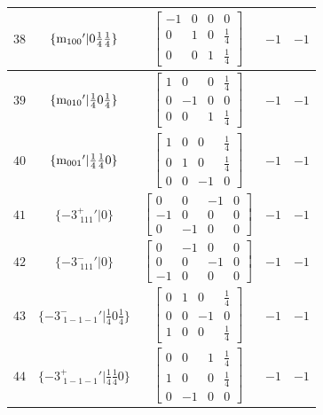 \documentclass[fleqn,8pt]{jsarticle}
\begin{document}
\begin{longtable}{ccccc}
$ 38 $ & $ \{{\rm m}_{100}{}'|0 \frac{1}{4} \frac{1}{4}\} $ & $ \begin{bmatrix} -1 & 0 & 0 & 0 \\ 0 & 1 & 0 & \frac{1}{4} \\ 0 & 0 & 1 & \frac{1}{4} \end{bmatrix} $ & $ -1 $ & $ -1 $ \\ \hline
$ 39 $ & $ \{{\rm m}_{010}{}'|\frac{1}{4} 0 \frac{1}{4}\} $ & $ \begin{bmatrix} 1 & 0 & 0 & \frac{1}{4} \\ 0 & -1 & 0 & 0 \\ 0 & 0 & 1 & \frac{1}{4} \end{bmatrix} $ & $ -1 $ & $ -1 $ \\ \hline
$ 40 $ & $ \{{\rm m}_{001}{}'|\frac{1}{4} \frac{1}{4} 0\} $ & $ \begin{bmatrix} 1 & 0 & 0 & \frac{1}{4} \\ 0 & 1 & 0 & \frac{1}{4} \\ 0 & 0 & -1 & 0 \end{bmatrix} $ & $ -1 $ & $ -1 $ \\ \hline
$ 41 $ & $ \{-3^{+}_{\,\,111}{}'|0\} $ & $ \begin{bmatrix} 0 & 0 & -1 & 0 \\ -1 & 0 & 0 & 0 \\ 0 & -1 & 0 & 0 \end{bmatrix} $ & $ -1 $ & $ -1 $ \\ \hline
$ 42 $ & $ \{-3^{-}_{\,\,111}{}'|0\} $ & $ \begin{bmatrix} 0 & -1 & 0 & 0 \\ 0 & 0 & -1 & 0 \\ -1 & 0 & 0 & 0 \end{bmatrix} $ & $ -1 $ & $ -1 $ \\ \hline
$ 43 $ & $ \{-3^{-}_{\,\,1-1-1}{}'|\frac{1}{4} 0 \frac{1}{4}\} $ & $ \begin{bmatrix} 0 & 1 & 0 & \frac{1}{4} \\ 0 & 0 & -1 & 0 \\ 1 & 0 & 0 & \frac{1}{4} \end{bmatrix} $ & $ -1 $ & $ -1 $ \\ \hline
$ 44 $ & $ \{-3^{+}_{\,\,1-1-1}{}'|\frac{1}{4} \frac{1}{4} 0\} $ & $ \begin{bmatrix} 0 & 0 & 1 & \frac{1}{4} \\ 1 & 0 & 0 & \frac{1}{4} \\ 0 & -1 & 0 & 0 \end{bmatrix} $ & $ -1 $ & $ -1 $ \\ \hline

\end{longtable}
\end{document}
